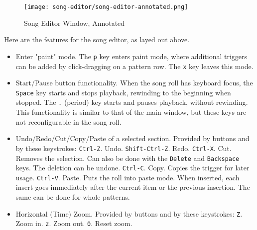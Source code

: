 \begin{figure}[H]
   \centering 
   \texttt{[image: song-editor/song-editor-annotated.png]}
   \caption{Song Editor Window, Annotated}
   \label{fig:song_editor_window_annotated}
\end{figure}

   Here are the features for the song editor, as layed out above.

   \begin{itemize}
      \item Enter "paint" mode.
         The \texttt{p} key enters paint mode, where additional triggers
         can be added by click-dragging on a pattern row.
         The \texttt{x} key leaves this mode.
      \item Start/Pause button functionality.
         When the song roll has keyboard focus,
         the \texttt{Space} key starts and stops playback, rewinding to the
         beginning when stopped.
         The \texttt{.} (period) key starts and pauses playback, without
         rewinding.
         This functionality is similar to that of the main window, but
         these keys are not reconfigurable in the song roll.
      \item Undo/Redo/Cut/Copy/Paste of a selected section.
         Provided by buttons and by these keystrokes:
         \texttt{Ctrl-Z}. Undo.
         \texttt{Shift-Ctrl-Z}. Redo.
         \texttt{Ctrl-X}. Cut.  Removes the selection.
            Can also be done with the \texttt{Delete} and
            \texttt{Backspace} keys.
            The deletion can be undone.
         \texttt{Ctrl-C}. Copy.
         Copies the trigger for later usage.
         \texttt{Ctrl-V}. Paste.
            Puts the roll into paste mode.
            When inserted, each insert goes immediately
            after the current item or the previous insertion.  The same can be
            done for whole patterns.
      \item Horizontal (Time) Zoom.
         Provided by buttons and by these keystrokes:
         \texttt{Z}. Zoom in.
         \texttt{z}. Zoom out.
         \texttt{0}. Reset zoom.
   \end{itemize}

